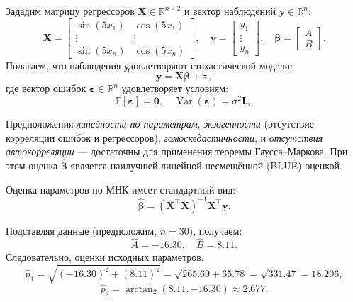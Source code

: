 Зададим матрицу регрессоров $\mathbf{X} \in \mathbb{R}^{n \times 2}$ и вектор наблюдений $\mathbf{y} \in \mathbb{R}^n$:
\[
\mathbf{X} = 
\begin{bmatrix}
\sin(5x_1) & \cos(5x_1) \\
\vdots & \vdots \\
\sin(5x_n) & \cos(5x_n)
\end{bmatrix}, 
\quad
\mathbf{y} = 
\begin{bmatrix}
y_1 \\ \vdots \\ y_n
\end{bmatrix},
\quad
\boldsymbol{\beta} = 
\begin{bmatrix}
A \\ B
\end{bmatrix}.
\]
Полагаем, что наблюдения удовлетворяют стохастической модели:
\begin{equation}
    \mathbf{y} = \mathbf{X} \boldsymbol{\beta} + \boldsymbol{\varepsilon},
\end{equation}
где вектор ошибок $\boldsymbol{\varepsilon} \in \mathbb{R}^n$ удовлетворяет условиям:
\begin{equation}
    \mathbb{E}[\boldsymbol{\varepsilon}] = \mathbf{0}, \quad \operatorname{Var}(\boldsymbol{\varepsilon}) = \sigma^2 \mathbf{I}_n.
\end{equation}

\begin{remark}
Предположения \textit{линейности по параметрам}, \textit{экзогенности} (отсутствие корреляции ошибок и регрессоров), \textit{гомоскедастичности}, и \textit{отсутствия автокорреляции} — достаточны для применения теоремы Гаусса–Маркова. При этом оценка $\hat{\boldsymbol{\beta}}$ является наилучшей линейной несмещённой (BLUE) оценкой.
\end{remark}

Оценка параметров по МНК имеет стандартный вид:
\begin{equation}
    \hat{\boldsymbol{\beta}} = (\mathbf{X}^\top \mathbf{X})^{-1} \mathbf{X}^\top \mathbf{y}.
\end{equation}

Подставляя данные (предположим, $n = 30$), получаем:
\[
\hat{A} = -16.30, \quad \hat{B} = 8.11.
\]
Следовательно, оценки исходных параметров:
\[
\hat{p}_1 = \sqrt{(-16.30)^2 + (8.11)^2} = \sqrt{265.69 + 65.78} = \sqrt{331.47} = 18.206,
\]
\[
\hat{p}_2 = \arctan_2(8.11, -16.30) \approx 2.677.
\]

